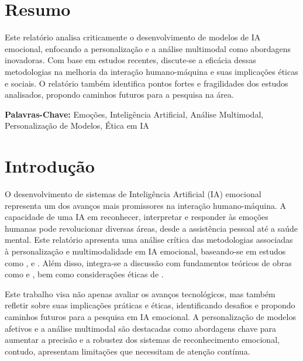\documentclass[a4paper,12pt]{report}
\begin{document}
	
	\newpage
	\thispagestyle{empty}
	\mbox{}
	\newpage
	
	
	\section*{Resumo}
	
	Este relatório analisa criticamente o desenvolvimento de modelos de IA emocional, enfocando a personalização e a análise multimodal como abordagens inovadoras. Com base em estudos recentes, discute-se a eficácia dessas metodologias na melhoria da interação humano-máquina e suas implicações éticas e sociais. O relatório também identifica pontos fortes e fragilidades dos estudos analisados, propondo caminhos futuros para a pesquisa na área.
	
	\vspace{4em}
	
	\noindent\textbf{Palavras-Chave:} \normalsize{Emoções, Inteligência Artificial, Análise Multimodal, Personalização de Modelos, Ética em IA}
	
	\newpage
	
	
	\section{Introdução}
	
	O desenvolvimento de sistemas de Inteligência Artificial (IA) emocional representa um dos avanços mais promissores na interação humano-máquina. A capacidade de uma IA em reconhecer, interpretar e responder às emoções humanas pode revolucionar diversas áreas, desde a assistência pessoal até a saúde mental. Este relatório apresenta uma análise crítica das metodologias associadas à personalização e multimodalidade em IA emocional, baseando-se em estudos como \textcite{kargarandehkordi2024}, \textcite{gursesli2024} e \textcite{lee2024}. Além disso, integra-se a discussão com fundamentos teóricos de obras como \textcite{picard1997} e \textcite{pessoa2013}, bem como considerações éticas de \textcite{mueller2020}.
	
	Este trabalho visa não apenas avaliar os avanços tecnológicos, mas também refletir sobre suas implicações práticas e éticas, identificando desafios e propondo caminhos futuros para a pesquisa em IA emocional. A personalização de modelos afetivos e a análise multimodal são destacadas como abordagens chave para aumentar a precisão e a robustez dos sistemas de reconhecimento emocional, contudo, apresentam limitações que necessitam de atenção contínua.
	
\end{document}
